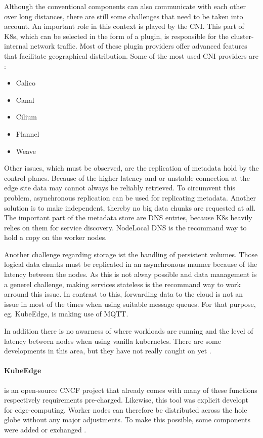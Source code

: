 \documentclass[MSC,Master,english]{twbook}%
\begin{document}
Although the conventional components can also communicate with each other over long distances, there are still some challenges that need to be taken into account. An important role in this context is played by the \ac{CNI}. This part of \ac{K8s}, which can be selected in the form of a plugin, is responsible for the cluster-internal network traffic. Most of these plugin providers offer advanced features that facilitate geographical distribution. Some of the most used \ac{CNI} providers are \cite{k8s-cni}:

\begin{itemize}
    \itemsep0em
    \item Calico
    \item Canal
    \item Cilium
    \item Flannel
    \item Weave
\end{itemize}

Other issues, which must be observed, are the replication of metadata hold by the control planes. Because of the higher latency and-or unstable connection at the edge site data may cannot always be reliably retrieved. To circumvent this problem, asynchronous replication can be used for replicating metadata. Another solution is to make independent, thereby no big data chunks are requested at all. The important part of the metadata store are \ac{DNS} entries, because \ac{K8s} heavily relies on them for service discovery. NodeLocal DNS is the recommand way \cite{k8sdnslocal} to hold a copy on the worker nodes. 

Another challenge regarding storage ist the handling of persistent volumes. Those logical data chunks must be replicated in an asynchronous manner because of the latency between the nodes. As this is not alway possible and data management is a generel challenge, making services stateless is the recommand way to work arround this issue.  In contrast to this, forwarding data to the cloud is not an issue in most of the times when using suitable message queues. For that purpose, eg. KubeEdge, is making use of \ac{MQTT}.   

In addition there is no awarness of where workloads are running and the level of latency between nodes when using vanilla kubernetes. There are some developments in this area, but they have not really caught on yet \cite{k8s-sharping-edge}\cite{tk-k8s-edge-scheduler}\cite{5g-k8s-scheduler}.

\paragraph{KubeEdge} is an open-source \ac{CNCF} project \cite{hal-kubeedge} that already comes with many of these functions respectively requirements pre-charged. Likewise, this tool was explicit developt for edge-computing.  Worker nodes can therefore be distributed across the hole globe without any major adjustments. To make this possible, some components were added or exchanged \cite{kubedge}.
\end{document}
